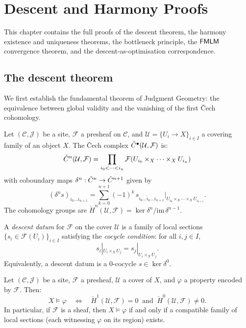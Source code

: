 \chapter{Descent and Harmony Proofs}
\label{ch:descent-proofs}

This chapter contains the full proofs of the descent theorem, the
harmony existence and uniqueness theorems, the bottleneck principle,
the $\mathsf{FMLM}$ convergence theorem, and the descent-as-optimisation
correspondence.

\section{The descent theorem}
\label{sec:descent-thm}

We first establish the fundamental theorem of Judgment Geometry: the
equivalence between global validity and the vanishing of the first
\v{C}ech cohomology.

\begin{definition}
\label{def:cech-complex}
Let $(\mathcal{C}, \mathcal{J})$ be a site, $\mathcal{F}$ a presheaf
on $\mathcal{C}$, and $\mathcal{U} = \{U_i \to X\}_{i \in I}$ a
covering family of an object $X$.  The \v{C}ech complex
$\check{C}^\bullet(\mathcal{U}, \mathcal{F})$ is:
\[
  \check{C}^n(\mathcal{U}, \mathcal{F})
  = \prod_{i_0 < \cdots < i_n}
    \mathcal{F}(U_{i_0} \times_X \cdots \times_X U_{i_n})
\]
with coboundary maps $\delta^n : \check{C}^n \to \check{C}^{n+1}$ given by
\[
  (\delta^n s)_{i_0 \ldots i_{n+1}}
  = \sum_{k=0}^{n+1} (-1)^k\, s_{i_0 \ldots \hat{i}_k \ldots i_{n+1}}
    \big|_{U_{i_0} \times_X \cdots \times_X U_{i_{n+1}}}.
\]
The cohomology groups are $\check{H}^n(\mathcal{U}, \mathcal{F})
= \ker \delta^n / \mathrm{im}\, \delta^{n-1}$.
\end{definition}

\begin{definition}
\label{def:descent-datum}
A \emph{descent datum} for $\mathcal{F}$ on the cover $\mathcal{U}$
is a family of local sections $\{s_i \in \mathcal{F}(U_i)\}_{i \in I}$
satisfying the \emph{cocycle condition}: for all $i, j \in I$,
\[
  s_i|_{U_i \times_X U_j} = s_j|_{U_i \times_X U_j}.
\]
Equivalently, a descent datum is a 0-cocycle $s \in \ker \delta^0$.
\end{definition}

\begin{theorem}
\label{thm:fundamental}
Let $(\mathcal{C}, \mathcal{J})$ be a site, $\mathcal{F}$ a presheaf,
$\mathcal{U}$ a cover of $X$, and $\varphi$ a property encoded by
$\mathcal{F}$.  Then:
\[
  X \models \varphi
  \quad\Longleftrightarrow\quad
  \check{H}^1(\mathcal{U}, \mathcal{F}) = 0
  \;\;\text{and}\;\;
  \check{H}^0(\mathcal{U}, \mathcal{F}) \neq 0.
\]
In particular, if $\mathcal{F}$ is a sheaf, then $X \models \varphi$
if and only if a compatible family of local sections (each witnessing
$\varphi$ on its region) exists.
\end{theorem}

